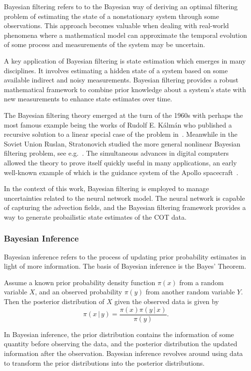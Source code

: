 Bayesian filtering refers to to the Bayesian way of deriving an optimal filtering problem of estimating the state of a nonstationary system through some observations.
This approach becomes valuable when dealing with real-world phenomena where a mathematical model can approximate the temporal evolution of some process and measurements of the system may be uncertain.


A key application of Bayesian filtering is state estimation which emerges in many disciplines.
It involves estimating a hidden state of a system based on some available indirect and noisy measurements.
Bayesian filtering provides a robust mathematical framework to combine prior knowledge about a system's state with new measurements to enhance state estimates over time.

The Bayesian filtering theory emerged at the turn of the 1960s with perhaps the most famous example being the works of Rudolf E. Kálmán who published a recursive solution to a linear special case of the problem in~\cite{kalman}.
Meanwhile in the Soviet Union Ruslan, Stratonovich studied the more general nonlinear Bayesian filtering problem, see e.g.~\cite{stratonovich2, stratonovich1}.
The simultaneous advances in digital computers allowed the theory to prove itself quickly useful in many applications, an early well-known example of which is the guidance system of the Apollo spacecraft~\cite{mcgee}.

In the context of this work, Bayesian filtering is employed to manage uncertainties related to the neural network model.
The neural network is capable of capturing the advection fields, and the Bayesian filtering framework provides a way to generate probailistic state estimates of the COT data.

\subsubsection{Bayesian Inference}
Bayesian inference refers to the process of updating prior probability estimates in light of more information.
The basis of Bayesian inference is the Bayes' Theorem.
\begin{theorem}
    Assume a known prior probability density function $\pi(x)$ from a random variable $X$, and an observed probability $\pi(y)$ from another random variable $Y$.
    Then the posterior distribution of $X$ given the observed data is given by
    \begin{equation}
        \pi(x \, \vert \, y) = \frac{\pi(x) \pi(y \, \vert \, x)}{\pi(y)}.
    \end{equation}
\end{theorem}
In Bayesian inference, the prior distribution contains the information of some quantity before observing the data, and the posterior distribution the updated information after the observation.
Bayesian inference revolves around using data to transform the prior distributions into the posterior distributions.

